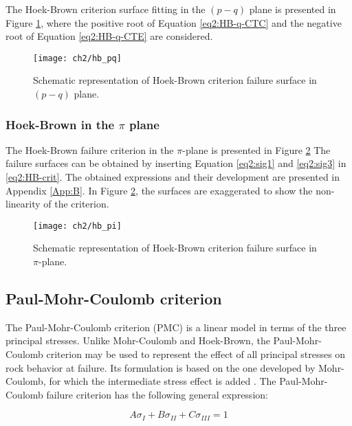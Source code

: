 The Hoek-Brown criterion surface fitting in the $(p-q)$ plane is presented in Figure \ref{fig2:hb_pq}, where the positive root of Equation \ref{eq2:HB-q-CTC} and the negative root of Equation \ref{eq2:HB-q-CTE} are considered.

\begin{figure}[tb]
    \centering
    \texttt{[image: ch2/hb\_pq]}
    \caption{Schematic representation of Hoek-Brown criterion failure surface in $(p-q)$ plane.}
    \label{fig2:hb_pq}
\end{figure} 

\subsubsection{Hoek-Brown in the \texorpdfstring{$\pi$}{pi} plane}\label{ch2:HB_pi}

The Hoek-Brown failure criterion in the $\pi$-plane is presented in Figure \ref{fig2:hb_pi} The failure surfaces can be obtained by inserting Equation \ref{eq2:sig1} and \ref{eq2:sig3} in \ref{eq2:HB-crit}. The obtained expressions and their development are presented in Appendix \ref{App:B}. In Figure \ref{fig2:hb_pi}, the surfaces are exaggerated to show the non-linearity of the criterion.  

\begin{figure}[tb]
    \centering
    \texttt{[image: ch2/hb\_pi]}
    \caption{Schematic representation of Hoek-Brown criterion failure surface in $\pi$-plane.}
    \label{fig2:hb_pi}
\end{figure} 

\subsection{Paul-Mohr-Coulomb criterion}\label{ch2:PMC}

The Paul-Mohr-Coulomb criterion (PMC) is a linear model in terms of the three principal stresses. Unlike Mohr-Coulomb and Hoek-Brown, the Paul-Mohr-Coulomb criterion may be used to represent the effect of all principal stresses on rock behavior at failure. Its formulation is based on the one developed by Mohr-Coulomb, for which the intermediate stress effect is added \cite{Paul1968}. The Paul-Mohr-Coulomb failure criterion has the following general expression:

\begin{equation}\label{eq2:PMC}
    A\sigma_I + B\sigma_{II}+C\sigma_{III} = 1
\end{equation}

